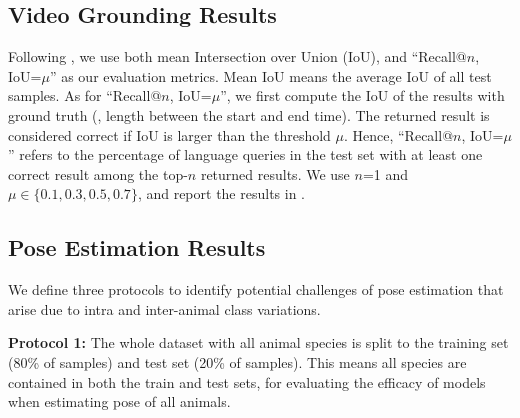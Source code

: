 \documentclass[10pt,twocolumn,letterpaper]{article}
\begin{document}
    
    \subsection{Video Grounding Results}
    Following \cite{gao2017tall, zhang2020span, mun2020LGI}, we use both mean Intersection over Union (IoU), and ``Recall@$n$, IoU=$\mu$'' as our evaluation metrics. Mean IoU means the average IoU of all test samples. As for ``Recall@$n$, IoU=$\mu$'', we first compute the IoU of the results with ground truth (\ie, length between the start and end time). The returned result is considered correct if IoU is larger than the threshold $\mu$. Hence, ``Recall@$n$, IoU=$\mu$'' refers to the percentage of language queries in the test set with at least one correct result among the top-$n$ returned results. We use $n$=1 and $\mu\in \{0.1,0.3,0.5,0.7\}$, and report the results in .
    
    
    \begin{table}[h]
      \centering
      \vspace{-0.3cm}
      \caption{Results of video grounding}
      \vspace{-0.36cm}
      \label{table:vg}
      \vspace{-0.4cm}
    \end{table}
    
    
    
    \subsection{Pose Estimation Results}
    We define three protocols to identify potential challenges of pose estimation that arise due to intra and inter-animal class variations.
    
    
    \textbf{Protocol 1:} The whole dataset with all animal species is split to the training set (80\% of samples) and test set (20\% of samples). This means all species are contained in both the train and test sets, for evaluating the efficacy of models when estimating pose of all animals.
    
\end{document}
